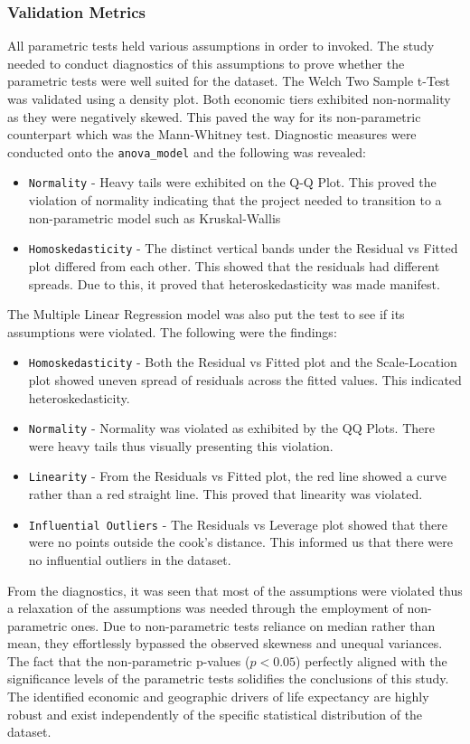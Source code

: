 \documentclass[3pt, a4paper]{article}
\begin{document}
\subsubsection{Validation Metrics}
All parametric tests held various assumptions in order to invoked. The study needed to conduct diagnostics of this assumptions to prove whether the parametric tests were well suited for the dataset. The Welch Two Sample t-Test was validated using a density plot. Both economic tiers exhibited non-normality as they were negatively skewed. This paved the way for its non-parametric counterpart which was the Mann-Whitney test. Diagnostic measures were conducted onto the \texttt{anova\_model} and the following was revealed:
\begin{itemize}[noitemsep,topsep=0pt]
    \item \texttt{Normality} - Heavy tails were exhibited on the Q-Q Plot. This proved the violation of normality indicating that the project needed to transition to a non-parametric model such as Kruskal-Wallis
    \item \texttt{Homoskedasticity} - The distinct vertical bands under the Residual vs Fitted plot differed from each other. This showed that the residuals had different spreads. Due to this, it proved that heteroskedasticity was made manifest.
\end{itemize}

The Multiple Linear Regression model was also put the test to see if its assumptions were violated. The following were the findings:
\begin{itemize}[noitemsep,topsep=0pt]
    \item \texttt{Homoskedasticity} - Both the Residual vs Fitted plot and the Scale-Location plot showed uneven spread of residuals across the fitted values. This indicated heteroskedasticity.
    \item \texttt{Normality} - Normality was violated as exhibited by the QQ Plots. There were heavy tails thus visually presenting this violation.
    \item \texttt{Linearity} - From the Residuals vs Fitted plot, the red line showed a curve rather than a red straight line. This proved that linearity was violated.
    \item \texttt{Influential Outliers} - The Residuals vs Leverage plot showed that there were no points outside the cook's distance. This informed us that there were no influential outliers in the dataset.
\end{itemize}
From the diagnostics, it was seen that most of the assumptions were violated thus a relaxation of the assumptions was needed through the employment of non-parametric ones. Due to non-parametric tests reliance on median rather than mean, they effortlessly bypassed the observed skewness and unequal variances. The fact that the non-parametric p-values ($p < 0.05$) perfectly aligned with the significance levels of the parametric tests solidifies the conclusions of this study. The identified economic and geographic drivers of life expectancy are highly robust and exist independently of the specific statistical distribution of the dataset.
\end{document}
